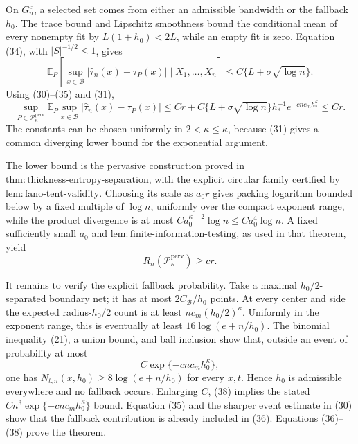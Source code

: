 On \(G_n^c\), a selected set comes from either an admissible bandwidth or the fallback \(h_0\).  The trace bound and Lipschitz smoothness bound the conditional mean of every nonempty fit by \(L(1+h_0)<2L\), while an empty fit is zero.  Equation (34), with \(|S|^{-1/2}\le1\), gives
\[
 \mathbb E_P\left[\sup_{x\in\mathcal B}|\widehat\tau_n(x)-\tau_P(x)|\mid X_1,\ldots,X_n\right]
 \le C\{L+\sigma\sqrt{\log n}\}. \tag{35}
\]
Using (30)--(35) and (31),
\[
 \sup_{P\in\mathcal P_{\kappa}^{\mathrm{perv}}}
 \mathbb E_P\sup_{x\in\mathcal B}|\widehat\tau_n(x)-\tau_P(x)|
 \le Cr+C\{L+\sigma\sqrt{\log n}\}h_*^{-1}e^{-cnc_mh_*^{\kappa}}
 \le Cr. \tag{36}
\]
The constants can be chosen uniformly in \(2<\kappa\le\overline\kappa\), because (31) gives a common diverging lower bound for the exponential argument.

The lower bound is the pervasive construction proved in \(\mathrm{thm:thickness\text{-}entropy\text{-}separation}\), with the explicit circular family certified by \(\mathrm{lem:fano\text{-}tent\text{-}validity}\).  Choosing its scale as \(a_0r\) gives packing logarithm bounded below by a fixed multiple of \(\log n\), uniformly over the compact exponent range, while the product divergence is at most \(Ca_0^{\kappa+2}\log n\le Ca_0^4\log n\).  A fixed sufficiently small \(a_0\) and \(\mathrm{lem:finite\text{-}information\text{-}testing}\), as used in that theorem, yield
\[
 R_n(\mathcal P_{\kappa}^{\mathrm{perv}})\ge cr. \tag{37}
\]

It remains to verify the explicit fallback probability.  Take a maximal \(h_0/2\)-separated boundary net; it has at most \(2C_{\mathcal B}/h_0\) points.  At every center and side the expected radius-\(h_0/2\) count is at least \(nc_m(h_0/2)^{\kappa}\).  Uniformly in the exponent range, this is eventually at least \(16\log(e+n/h_0)\).  The binomial inequality (21), a union bound, and ball inclusion show that, outside an event of probability at most
\[
 C\exp\{-cnc_mh_0^{\kappa}\}, \tag{38}
\]
one has \(N_{t,n}(x,h_0)\ge8\log(e+n/h_0)\) for every \(x,t\).  Hence \(h_0\) is admissible everywhere and no fallback occurs.  Enlarging \(C\), (38) implies the stated \(Cn^3\exp\{-cnc_mh_0^{\kappa}\}\) bound.  Equation (35) and the sharper event estimate in (30) show that the fallback contribution is already included in (36).  Equations (36)--(38) prove the theorem.